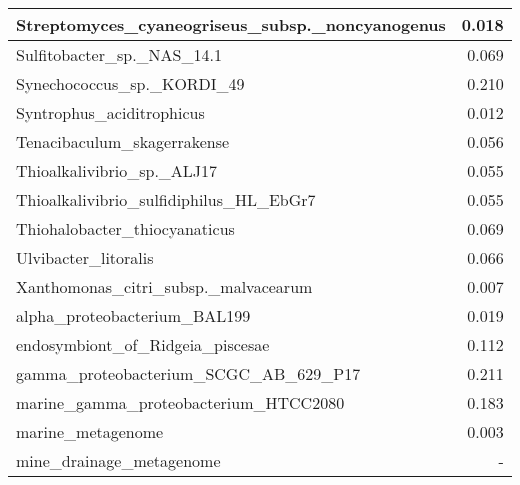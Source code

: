 \documentclass[12pt,a4paper]{article}
\begin{document}
\begin{table}[ht]
\begin{center}
\begin{tabular}{|l*{1}{|r}|}
Streptomyces\_cyaneogriseus\_subsp.\_noncyanogenus & 0.018 \\ \hline
Sulfitobacter\_sp.\_NAS\_14.1 & 0.069 \\ \hline
Synechococcus\_sp.\_KORDI\_49 & 0.210 \\ \hline
Syntrophus\_aciditrophicus & 0.012 \\ \hline
Tenacibaculum\_skagerrakense & 0.056 \\ \hline
Thioalkalivibrio\_sp.\_ALJ17 & 0.055 \\ \hline
Thioalkalivibrio\_sulfidiphilus\_HL\_EbGr7 & 0.055 \\ \hline
Thiohalobacter\_thiocyanaticus & 0.069 \\ \hline
Ulvibacter\_litoralis & 0.066 \\ \hline
Xanthomonas\_citri\_subsp.\_malvacearum & 0.007 \\ \hline
alpha\_proteobacterium\_BAL199 & 0.019 \\ \hline
endosymbiont\_of\_Ridgeia\_piscesae & 0.112 \\ \hline
gamma\_proteobacterium\_SCGC\_AB\_629\_P17 & 0.211 \\ \hline
marine\_gamma\_proteobacterium\_HTCC2080 & 0.183 \\ \hline
marine\_metagenome & 0.003 \\ \hline
mine\_drainage\_metagenome & - \\ \hline
\end{tabular}
\end{center}
\end{table}
\end{document}
